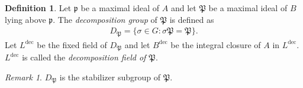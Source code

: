 \documentclass[12pt]{report}
\theoremstyle{plain}
\theoremstyle{remark}
\newtheorem*{remark}{Remark}
\theoremstyle{definition}
\newtheorem{definition}[theorem]{Definition}
\begin{document}
\begin{definition}
    Let $\mathfrak{p}$ be a maximal ideal of $A$ and let $\mathfrak{P}$ be a maximal ideal of $B$ lying above $\mathfrak{p}$. The \emph{decomposition group} of $\mathfrak{P}$ is defined as
    \begin{align*}
        D_\mathfrak{P}=\{\sigma\in G:\sigma\mathfrak{P}=\mathfrak{P}\}.
    \end{align*}
    Let $L^\mathrm{dec}$ be the fixed field of $D_\mathfrak{P}$ and let $B^\mathrm{dec}$ be the integral closure of $A$ in $L^\mathrm{dec}$. $L^\mathrm{dec}$ is called the \emph{decomposition field of $\mathfrak{P}$}.
    \begin{figure}[H]
        \centering
    \end{figure}
\end{definition}
\begin{remark}
    $D_\mathfrak{P}$ is the stabilizer subgroup of $\mathfrak{P}$.
\end{remark}
\end{document}
